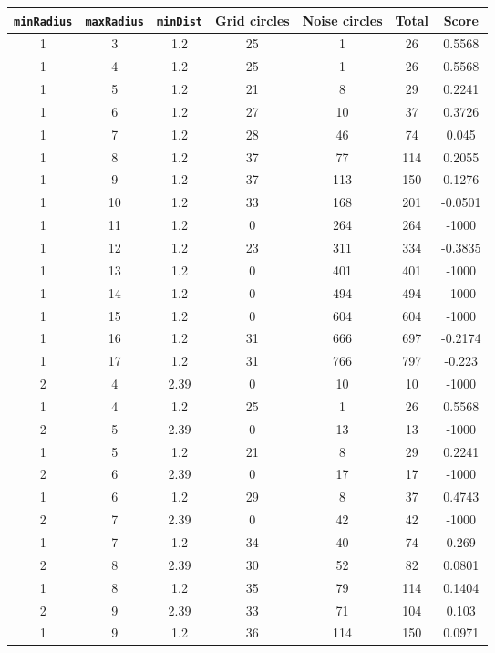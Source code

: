 \documentclass[letterpaper, 12pt]{article}
\begin{document}
\begin{longtable}{|c|c|c|c|c|c|c|}
\hline
\textbf{\texttt{minRadius}} & \textbf{\texttt{maxRadius}} & \textbf{\texttt{minDist}} & \textbf{Grid circles} & \textbf{Noise circles} & \textbf{Total} & \textbf{Score} \\
\hline
1 & 3 & 1.2 & 25 & 1 & 26 & 0.5568 \\
\hline
1 & 4 & 1.2 & 25 & 1 & 26 & 0.5568 \\
\hline
1 & 5 & 1.2 & 21 & 8 & 29 & 0.2241 \\
\hline
1 & 6 & 1.2 & 27 & 10 & 37 & 0.3726 \\
\hline
1 & 7 & 1.2 & 28 & 46 & 74 & 0.045 \\
\hline
1 & 8 & 1.2 & 37 & 77 & 114 & 0.2055 \\
\hline
1 & 9 & 1.2 & 37 & 113 & 150 & 0.1276 \\
\hline
1 & 10 & 1.2 & 33 & 168 & 201 & -0.0501 \\
\hline
1 & 11 & 1.2 & 0 & 264 & 264 & -1000 \\
\hline
1 & 12 & 1.2 & 23 & 311 & 334 & -0.3835 \\
\hline
1 & 13 & 1.2 & 0 & 401 & 401 & -1000 \\
\hline
1 & 14 & 1.2 & 0 & 494 & 494 & -1000 \\
\hline
1 & 15 & 1.2 & 0 & 604 & 604 & -1000 \\
\hline
1 & 16 & 1.2 & 31 & 666 & 697 & -0.2174 \\
\hline
1 & 17 & 1.2 & 31 & 766 & 797 & -0.223 \\
\hline
2 & 4 & 2.39 & 0 & 10 & 10 & -1000 \\
\hline
1 & 4 & 1.2 & 25 & 1 & 26 & 0.5568 \\
\hline
2 & 5 & 2.39 & 0 & 13 & 13 & -1000 \\
\hline
1 & 5 & 1.2 & 21 & 8 & 29 & 0.2241 \\
\hline
2 & 6 & 2.39 & 0 & 17 & 17 & -1000 \\
\hline
1 & 6 & 1.2 & 29 & 8 & 37 & 0.4743 \\
\hline
2 & 7 & 2.39 & 0 & 42 & 42 & -1000 \\
\hline
1 & 7 & 1.2 & 34 & 40 & 74 & 0.269 \\
\hline
2 & 8 & 2.39 & 30 & 52 & 82 & 0.0801 \\
\hline
1 & 8 & 1.2 & 35 & 79 & 114 & 0.1404 \\
\hline
2 & 9 & 2.39 & 33 & 71 & 104 & 0.103 \\
\hline
1 & 9 & 1.2 & 36 & 114 & 150 & 0.0971 \\

\end{longtable}
\end{document}
